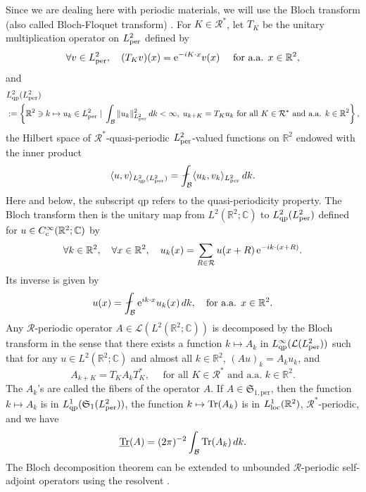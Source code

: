 \documentclass[a4paper,11pt]{article}
\newcommand{\Schatten}{{\mathfrak S}}
\newcommand{\per}{\mathrm{per}}
\newcommand{\Trper}{\underline{\Tr}}
\theoremstyle{plain}
\theoremstyle{remark}
\def\R{{\mathbb R}}
\def\C{{\mathbb C}}
\def\cB{{\mathcal B}}
\def\cR{{\mathcal R}}
\begin{document}
Since we are dealing here with periodic materials, we will use the {Bloch transform} (also
called Bloch-Floquet transform) \cite{ReedSimon4}. For $K \in \cR^\ast$, let $T_K$ be the unitary multiplication operator on $L^2_{\rm per}$ defined by
$$
\forall v \in L^2_{\rm per}, \quad (T_Kv)(x) = {\rm e}^{-iK\cdot x} v(x) \quad \mbox{ for a.a. } x \in \R^2,
$$
and
\begin{align*}
&L^2_{\rm qp}(L^2_{\rm per})\\
&:=\left\{ \R^2 \ni k \mapsto u_k \in L^2_{\rm per} \; | \; \int_\cB \|u_k\|_{L^2_{\rm per}}^2 \, dk < \infty, \; u_{k+K}=T_K u_k \mbox{ for all } K \in \cR^\ast \mbox{ and a.a. } k \in \R^2 \right\},
\end{align*}
the Hilbert space of $\cR^\ast$-quasi-periodic $L^2_{\rm per}$-valued functions on $\R^2$ endowed with the inner product
$$
\langle u,v\rangle_{L^2_{\rm qp}(L^2_{\rm per})}= \fint_\cB \langle u_k,v_k\rangle_{L^2_{\rm per}} \, dk.
$$
Here and below, the subscript qp refers to the quasi-periodicity property.
The Bloch transform then is the unitary map from $L^2(\R^2;\C)$ to $L^2_{\rm qp}(L^2_{\rm per})$ defined for $u \in C^\infty_{\rm c}(\R^2;\C)$ by
\begin{equation}\label{eq:Bloch_transform}
\forall k \in \R^2, \quad \forall x \in \R^2, \quad u_k(x) = \sum_{R \in \cR} u(x+R) \, {\rm e}^{-ik \cdot (x+R)}.
\end{equation}
Its inverse is given by
\begin{equation}\label{eq:inverse_Bloch_transform}
u(x) =\fint_\cB {\rm e}^{ik\cdot x} u_{k}(x) \, dk, \quad \mbox{for a.a. } x \in \R^2.
\end{equation}
Any $\cR$-periodic
operator $A \in {\mathcal L}(L^2(\R^2;\C))$ is decomposed by the Bloch
transform in the sense that there exists a function
$k \mapsto A_k$ in $L^\infty_{\rm qp}({\mathcal L}(L^2_{\rm per}))$ such that for any
$u \in L^2(\R^2;\C)$ and almost all $k \in \R^2$, $(Au)_k = A_ku_k$, and
\begin{equation}\label{eq:qpBloch}
A_{k+K} = T_K A_k T_K^\ast, \quad \mbox{ for all } K \in \cR^\ast \mbox{ and a.a. } k \in \R^2.
\end{equation}
The $A_{k}$'s are called the fibers of the operator $A$.
If $A \in \Schatten_{1,\per}$, then the function $k \mapsto A_{k}$ is
in $L^1_{\rm qp}(\Schatten_{1}(L^2_{\rm per}))$, the function $k
\mapsto \Tr(A_k)$ is in $L^1_{\rm loc}(\R^2)$, $\cR^{*}$-periodic, and we have
$$
\Trper(A) =(2\pi)^{-2} \int_\cB \Tr(A_k) \, dk.
$$
The Bloch decomposition theorem can be extended to unbounded
$\cR$-periodic self-adjoint operators using the resolvent \cite{ReedSimon4}.
\end{document}
